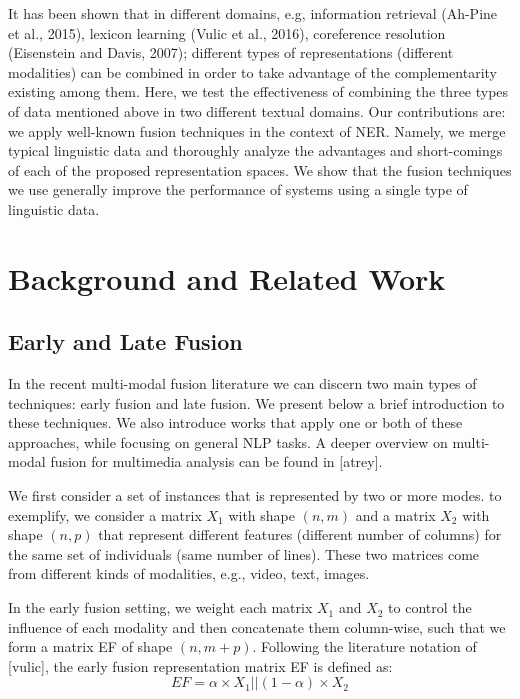 \documentclass[11pt]{article}
\begin{document}
It has been shown that in different domains, e.g, information retrieval (Ah-Pine et al., 2015), lexicon learning (Vulic et al., 2016), coreference resolution (Eisenstein and Davis, 2007); different types of representations (different modalities) can be combined in order to take advantage of the complementarity existing among them. Here, we
test the effectiveness of combining the three types of data mentioned above in two different textual domains. Our contributions are: we apply well-known fusion techniques in the context of NER. Namely, we merge typical linguistic data and thoroughly analyze the advantages and short-comings of each of the proposed representation spaces. We
show that the fusion techniques we use generally improve the performance of systems using a single type of linguistic data.
\section{Background and Related Work}                                                                                                                   
\subsection{Early and Late Fusion}

In the recent multi-modal fusion literature we can discern two main types of techniques: early fusion and late fusion. We present below a brief introduction to these techniques. We also introduce works that apply one or both of these approaches, while focusing on general NLP tasks. A deeper overview on multi-modal fusion for multimedia analysis can be found in [atrey].

We first consider a set of instances that is represented by two or more modes. to exemplify, we consider a matrix $X_1$ with shape $(n, m)$ and a matrix $X_2$ with shape $(n, p)$ that represent different features (different number of columns) for the same set of individuals (same number of lines).
These two matrices come from different kinds of modalities, e.g., video, text, images.

In the early fusion setting, we weight each matrix $X_1$ and $X_2$ to control the influence of each modality and then concatenate them column-wise,
such that we form a matrix EF of shape $(n, m + p)$. Following the literature notation of [vulic], the early fusion representation matrix EF is defined as:
\begin{equation}
EF = \alpha \times X_1 || (1 - \alpha) \times X_2
\end{equation}
\end{document}
